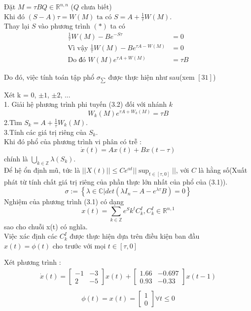  Đặt $M = \tau BQ \in \mathbb{R}^{n,n}$ ($Q$ chưa biết) \\
 Khi đó $(S-A)\tau = W(M) \mbox{ ta có } S = A +\frac{1}{\tau}W(M)$. \\
 Thay lại $S$ vào phương trình $(*)$ ta có 
 \begin{align}
\frac{1}{\tau}W(M) - Be^{-S\tau} &= 0 \nonumber \\
\mbox{Vì vậy } \frac{1}{\tau}W(M) - Be^{\tau A-W(M)} &= 0 \nonumber \\
\mbox{Do đó } W(M)e^{\tau A+W(M)} &= \tau B
 \end{align}
 \begin{al}
 Do đó, việc tính toán tập phổ $\sigma_{\sum}$ được thực hiện như sau(xem $[31]$)  \\
 \end{al}
 Xét k = 0, $\pm 1$, $\pm 2$, ... \\
 1. Giải hệ phương trình phi tuyến (3.2) đối với nhánh $k$
 $$ W_{k}(M)e^{\tau A + W_{k}(M)} = \tau B $$
 2.Tìm $S_{k} = A + \frac{1}{\tau}W_{k}(M)$. \\
 3.Tính các giá trị riêng của $S_k$.\\
 Khi đó phổ của phương trình vi phân có trễ :
 $$\dot{x}(t) = Ax(t) + Bx(t - \tau)$$ 
 chính là $\displaystyle \bigcup_{k \in \mathbb{Z}}\lambda(S_{k})$. \\
 Để hệ ổn định mũ, tức là $ ||X(t)|| \leq Ce^{\alpha t}||\sup_{t \in \left[\tau,0\right]}|| $, với $C$ là hằng số(Xuất phát từ tính chất giá trị riêng của phần thực lớn nhất của phổ của (3.1)).\\
 $$\sigma := \left\{\lambda \in \mathbb{C}|det(\lambda I_{n}-A-e^{\lambda\tau}B) = 0\right\}$$
 Nghiệm của phương trình (3.1) có dạng 
 $$ x(t) = \displaystyle \sum_{k \in \mathbb{Z}}e^{S}k^{t}C_{k}^{I}, C_{k}^{I} \in \mathbb{R}^{n,1} $$ sao cho chuỗi x(t) có nghĩa. \\
 Việc xác định các $C_{k}^{I}$ được thực hiện dựa trên điều kiện ban đầu \\
 $x(t) = \phi(t)$ cho trước với mọi $t \in \left[\tau,0\right]$ \\
 \begin{vd}
 Xét phương trình : 
 \begin{align*}
 \dot{x}(t) = \begin{bmatrix}
 -1 & -3 \\
 2 & -5
 \end{bmatrix} x(t) + \begin{bmatrix}
 1.66 & -0.697 \\
 0.93 & -0.33
 \end{bmatrix}x(t-1) \\
 \end{align*}
 \begin{align*}
 \phi(t) = x(t) = \begin{bmatrix}
 1 \\
 0
 \end{bmatrix} \forall t \leq 0 \\
 \end{align*}
 \end{vd} 
